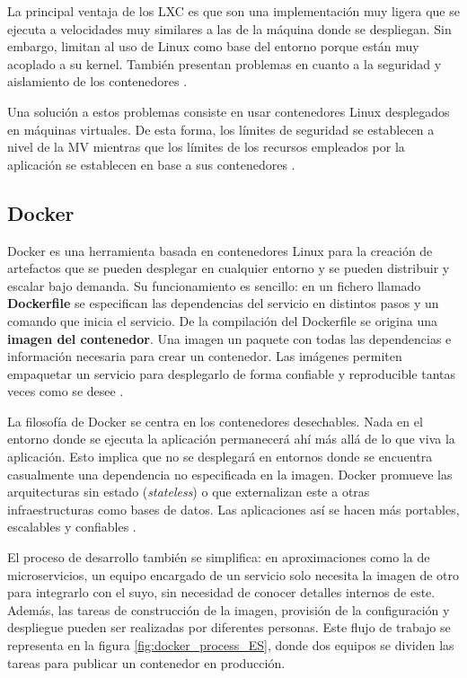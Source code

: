 \documentclass[11pt,spanish,listoffigures]{tfgetsinf}
\begin{document}
La principal ventaja de los LXC es que son una implementación muy ligera que se ejecuta a velocidades muy similares a las de la máquina donde se despliegan. Sin embargo, limitan al uso de Linux como base del entorno porque están muy acoplado a su kernel. También presentan problemas en cuanto a la seguridad y aislamiento de los contenedores \cite{Dua2014}. 

Una solución a estos problemas consiste en usar contenedores Linux desplegados en máquinas virtuales. De esta forma, los límites de seguridad se establecen a nivel de la MV mientras que los límites de los recursos empleados por la aplicación se establecen en base a sus contenedores \cite{DeAlfonso2017}.

\subsection{Docker}

Docker \cite{Matthias} es una herramienta basada en contenedores Linux para la creación de artefactos que se pueden desplegar en cualquier entorno y se pueden distribuir y escalar bajo demanda. Su funcionamiento es sencillo: en un fichero llamado \textbf{Dockerfile} se especifican las dependencias del servicio en distintos pasos y un comando que inicia el servicio. De la compilación del Dockerfile se origina una \textbf{imagen del contenedor}. Una imagen un paquete con todas las dependencias e información necesaria para crear un contenedor. Las imágenes permiten empaquetar un servicio para desplegarlo de forma confiable y reproducible tantas veces como se desee \cite{DelaTorre2018}.

La filosofía de Docker se centra en los contenedores desechables. Nada en el entorno donde se ejecuta la aplicación permanecerá ahí más allá de lo que viva la aplicación. Esto implica que no se desplegará en entornos donde se encuentra casualmente una dependencia no especificada en la imagen. Docker promueve las arquitecturas sin estado (\textit{stateless}) o que externalizan este a otras infraestructuras como bases de datos. Las aplicaciones así se hacen más portables, escalables y confiables \cite{Matthias}.

El proceso de desarrollo también se simplifica: en aproximaciones como la de microservicios, un equipo encargado de un servicio solo necesita la imagen de otro para integrarlo con el suyo, sin necesidad de conocer detalles internos de este. Además, las tareas de construcción de la imagen, provisión de la configuración y despliegue pueden ser realizadas por diferentes personas. Este flujo de trabajo se representa en la figura \ref{fig:docker_process_ES}, donde dos equipos se dividen las tareas para publicar un contenedor en producción. 
\end{document}
